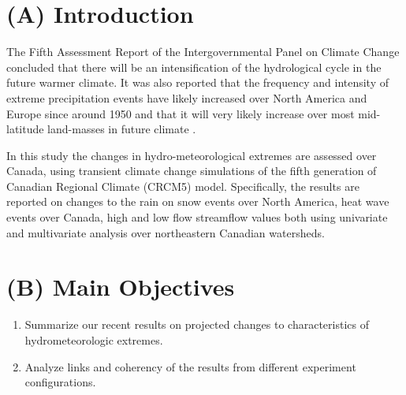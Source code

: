 \documentclass[a0,landscape]{a0poster}
\begin{document}
\begin{multicols*}{4} %


\color{DarkSlateGray} %

\section*{(A) Introduction}
The Fifth Assessment Report of the Intergovernmental Panel on Climate Change
concluded that there will be an intensification of the hydrological cycle in the
future warmer climate. It was also reported that the frequency and intensity of
extreme precipitation events have likely increased over North America and Europe
since around 1950 \citep{hartmann2013} and that it will very likely increase
over most mid-latitude land-masses in future climate \citep{collins2013}.

In this study the changes in hydro-meteorological extremes are assessed over
Canada, using transient climate change simulations of the fifth generation of
Canadian Regional Climate (CRCM5) model. Specifically, the results are reported
on changes to the rain on snow events over North America, heat wave events over
Canada, high and low flow streamflow values \citep{huziy2016impact} both using
univariate and multivariate analysis over northeastern Canadian watersheds.




\color{DarkSlateGray} %

\section*{(B) Main Objectives}
\begin{tcolorbox}[colback=white,colframe=green!40!black]
  \color{DarkSlateGray}
  \begin{enumerate}
    \item Summarize our recent results on projected changes to characteristics of hydrometeorologic extremes.
    \item Analyze links and coherency of the results from different experiment configurations.
  \end{enumerate}
\end{tcolorbox}


\end{multicols*}
\end{document}
